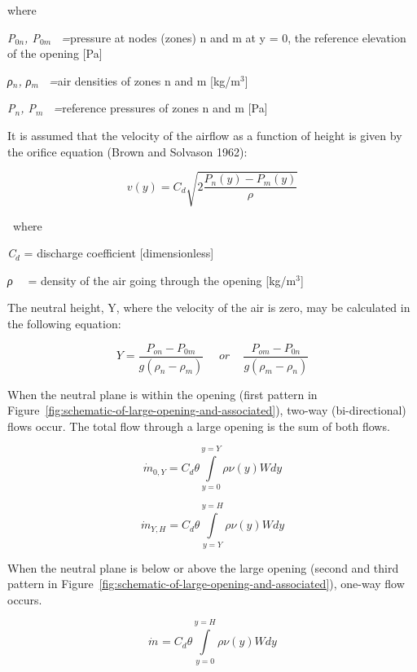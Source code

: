 where

\emph{P\(_{0n}\), P\(_{0m}\)~ =}pressure at nodes (zones) n and m at y = 0, the reference elevation of the opening {[}Pa{]}

\emph{ρ\(_{n}\), ρ\(_{m}\)~ =}air densities of zones n and m {[}kg/m\(^{3}\){]}

\emph{P\(_{n}\), P\(_{m}\)~ =}reference pressures of zones n and m {[}Pa{]}

It is assumed that the velocity of the airflow as a function of height is given by the orifice equation (Brown and Solvason 1962):

\begin{equation}
v(y) = {C_d}\sqrt {2\frac{{{P_n}(y) - {P_m}(y)}}{\rho }}
\end{equation}

~where

\emph{C\(_{d}\)} = discharge coefficient {[}dimensionless{]}

\emph{ρ}~~ = density of the air going through the opening {[}kg/m\(^{3}\){]}

The neutral height, Y, where the velocity of the air is zero, may be calculated in the following equation:

\begin{equation}
Y = \frac{{{P_{on}} - {P_{0m}}}}{{g({\rho_n} - {\rho_m})}}\,\,\,\,\,\,\,\,or\,\,\,\,\,\,\,\frac{{{P_{om}} - {P_{0n}}}}{{g({\rho_m} - {\rho_n})}}
\end{equation}

When the neutral plane is within the opening (first pattern in Figure~\ref{fig:schematic-of-large-opening-and-associated}), two-way (bi-directional) flows occur. The total flow through a large opening is the sum of both flows.

\begin{equation}
{\dot m_{0,Y}} = {C_d}\theta \int\limits_{y = 0}^{y = Y} {\rho \nu (y)Wdy}
\end{equation}

\begin{equation}
{\dot m_{Y,H}} = {C_d}\theta \int\limits_{y = Y}^{y = H} {\rho \nu (y)Wdy}
\end{equation}

When the neutral plane is below or above the large opening (second and third pattern in Figure~\ref{fig:schematic-of-large-opening-and-associated}), one-way flow occurs.

\begin{equation}
{\dot m_{}} = {C_d}\theta \int\limits_{y = 0}^{y = H} {\rho \nu (y)Wdy}
\end{equation}

